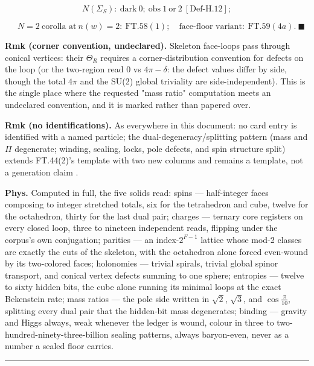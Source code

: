 \begin{theorem}
\[
N(\Sigma_S):\ \text{dark}\ 0;\ \text{obs}\ 1\ \text{or}\ 2\ [\mathrm{Def\text{-}H.12}];
\]

\[
\quad N{=}2\ \text{corolla at}\ n(w){=}2:\ \mathrm{FT.58}(1);\quad\text{face-floor variant}:\ \mathrm{FT.59}(4a).\ \blacksquare
\]

\textbf{Rmk (corner convention, undeclared).} Skeleton face-loops pass through conical vertices: their $\Theta_R$ requires a corner-distribution convention for defects on the loop (or the two-region read $0$ vs $4\pi-\delta$: the defect values differ by side, though the total $4\pi$ and the SU(2) global triviality are side-independent). This is the single place where the requested "mass ratio" computation meets an undeclared convention, and it is marked rather than papered over.

\textbf{Rmk (no identifications).} As everywhere in this document: no card entry is identified with a named particle; the dual-degeneracy/splitting pattern (mass and $\Pi$ degenerate; winding, sealing, locks, pole defects, and spin structure split) extends FT.44(2)'s template with two new columns and remains a template, not a generation claim .

\textbf{Phys.} Computed in full, the five solids read: spins — half-integer faces composing to integer stretched totals, six for the tetrahedron and cube, twelve for the octahedron, thirty for the last dual pair; charges — ternary core registers on every closed loop, three to nineteen independent reads, flipping under the corpus's own conjugation; parities — an index-$2^{F-1}$ lattice whose mod-2 classes are exactly the cuts of the skeleton, with the octahedron alone forced even-wound by its two-colored faces; holonomies — trivial spirals, trivial global spinor transport, and conical vertex defects summing to one sphere; entropies — twelve to sixty hidden bits, the cube alone running its minimal loops at the exact Bekenstein rate; mass ratios — the pole side written in $\sqrt2$, $\sqrt3$, and $\cos\frac\pi{10}$, splitting every dual pair that the hidden-bit mass degenerates; binding — gravity and Higgs always, weak whenever the ledger is wound, colour in three to two-hundred-ninety-three-billion sealing patterns, always baryon-even, never as a number a sealed floor carries.

\vspace{2pt}\noindent\rule{\textwidth}{0.4pt}\vspace{2pt}

\end{theorem}

